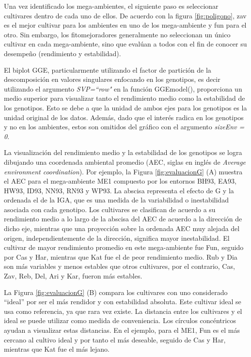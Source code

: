 Una vez identificado los mega-ambientes, el siguiente paso es seleccionar cultivares dentro de cada uno de ellos. De acuerdo con la figura  \ref{fig:poligono}, zav es el mejor cultivar para los ambientes en uno de los mega-ambiente y fun para el otro. Sin embargo, los fitomejoradores generalmente no seleccionan un único cultivar en cada mega-ambiente, sino que evalúan a todos con el fin de conocer su desempeño (rendimiento y estabilidad).  

El biplot GGE, particularmente utilizando el factor de partición de la descomposición en valores singulares enfocando en los genotipos, es decir utilizando el argumento \emph{SVP=``row"} en la función \textcolor{fandango}{GGEmodel()}, proporciona un medio superior para visualizar tanto el rendimiento medio como la estabilidad de los genotipos. Esto se debe a que la unidad de ambos ejes para los genotipos es la unidad original de los datos. Además, dado que el interés radica en los genotipos y no en los ambientes, estos son omitidos del gráfico con el argumento \emph{sizeEnv = 0}.

La visualización del rendimiento medio y la estabilidad de los genotipos se logra dibujando una coordenada ambiental promedio (AEC, siglas en inglés de \emph{Average environment coordination}). Por ejemplo, la Figura \ref{fig:evaluacionG} (A)  muestra el AEC para el mega-ambiente ME1 compuesto por los entornos BH93, EA93, HW93, ID93, NN93, RN93 y WP93. La abscisa representa el efecto de G y la ordenada el de la IGA, que es una medida de la variabilidad o inestabilidad asociada con cada genotipo. Los cultivares se clasifican de acuerdo a su rendimiento medio a lo largo de la abscisa del AEC de acuerdo a la dirección de dicho eje, mientras que una proyección sobre la ordenada AEC muy alejada del origen, independientemente de la dirección, significa mayor inestabilidad. El cultivar de mayor rendimiento promedio en este mega-ambiente fue Fun, seguido por Cas y Har, mientras que Kat fue el de peor rendimiento medio. Rub y Dia son más variables y menos estables que otros cultivares, por el contrario, Cas, Zav, Reb, Del, Ari y Kar, fueron más estables. 

La Figura \ref{fig:evaluacionG} (B) compara los cultivares con uno considerado ``ideal” por ser el más rendidor y con estabilidad absoluta. Este cultivar ideal se usa como referencia, ya que rara vez existe. La distancia entre los cultivares y el ideal se puede utilizar como medida de conveniencia. Los círculos concéntricos ayudan a visualizar estas distancias. En el ejemplo, para el ME1, Fun es el más cercano al cultivo ideal y por tanto el más deseable, seguido de Cas y Har, mientras que Kat fue el más lejano. \\


